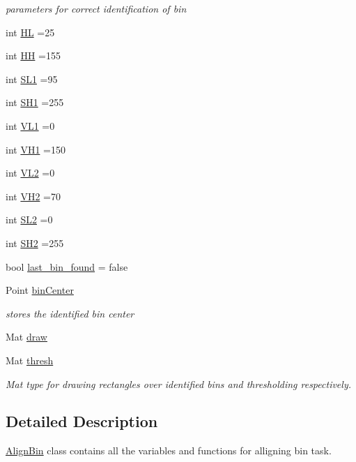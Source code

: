 \begin{DoxyCompactItemize}
\begin{DoxyCompactList}\small\item\em parameters for correct identification of bin \end{DoxyCompactList}\item 
int \hyperlink{classAlignBin_abf0dbeda76c43acd0a2b486ec177d9d2}{HL} =25
\item 
int \hyperlink{classAlignBin_a30665e4f9a2b3dc078436dc07651aa37}{HH} =155
\item 
int \hyperlink{classAlignBin_ac78c5993ded5dd986f1589783d7b3348}{S\+L1} =95
\item 
int \hyperlink{classAlignBin_ac3181b9b9b8c4c4e38728bf0f971f65a}{S\+H1} =255
\item 
int \hyperlink{classAlignBin_acb43ad409fe61135fe1eba9c0347f3e9}{V\+L1} =0
\item 
int \hyperlink{classAlignBin_a7c8ef2534ea4a97c0bb68468cda0a5f7}{V\+H1} =150
\item 
int \hyperlink{classAlignBin_a0a7000cecbb77704fb06e3d8112e131e}{V\+L2} =0
\item 
int \hyperlink{classAlignBin_a46ca3a67b1c4ae0a99c76ee620c72738}{V\+H2} =70
\item 
int \hyperlink{classAlignBin_af75c44f0d561a2052044bab2edd8b54b}{S\+L2} =0
\item 
int \hyperlink{classAlignBin_af2a1645fc1d755f97bc92700808c452d}{S\+H2} =255
\item 
bool \hyperlink{classAlignBin_aebcf51aa09f21c5451b84c7ebb6968db}{last\+\_\+bin\+\_\+found} = false
\item 
Point \hyperlink{classAlignBin_aa3f546821744ade1859388e68a6b862a}{bin\+Center}
\begin{DoxyCompactList}\small\item\em stores the identified bin center \end{DoxyCompactList}\item 
Mat \hyperlink{classAlignBin_a8493275959cec5434ecd656157cb72f0}{draw}
\item 
Mat \hyperlink{classAlignBin_a798e130d7fb332d98fc23f628b62b6ab}{thresh}
\begin{DoxyCompactList}\small\item\em Mat type for drawing rectangles over identified bins and thresholding respectively. \end{DoxyCompactList}\end{DoxyCompactItemize}


\subsection{Detailed Description}
\hyperlink{classAlignBin}{Align\+Bin} class contains all the variables and functions for alligning bin task. 

